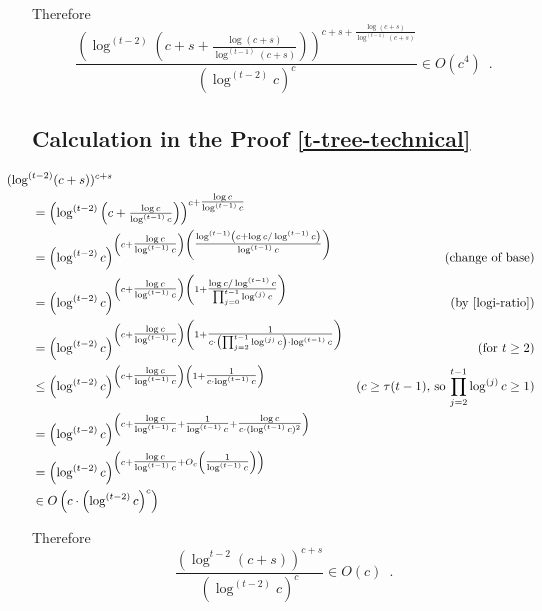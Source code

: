 \documentclass[kpfonts]{patmorin}
\theoremstyle{named}
\begin{document}
Therefore
\[
  \frac{\left(\log^{(t-2)}\left(c+s+\tfrac{\log(c+s)}{\log^{(t-1)}(c+s)}\right)\right)^{c+s+\tfrac{\log(c+s)}{\log^{(t-1)}(c+s)}}}
  {(\log^{(t-2)} c)^c}
  \in O(c^4) \enspace .
\]

\subsection{Calculation in the Proof \cref{t-tree-technical}}
\label{calculation-ii}

\begin{align*}
    & \hspace{-2em}(\log^{(t-2)}(c+s))^{c+s} \\
    & = \left(\log^{(t-2)}\left(c+\tfrac{\log c}{\log^{(t-1)} c}\right)\right)^{c+\tfrac{\log c}{\log^{(t-1)} c}} \\
    & = \left(\log^{(t-2)}c\right)^{\left(c+\tfrac{\log c}{\log^{(t-1)} c}\right)
    \left(\tfrac{\log^{(t-1)}\left(c+\log c/\log^{(t-1)} c\right)}{\log^{(t-1)} c}\right)} &\text{(change of base)} \\
    & = \left(\log^{(t-2)}c\right)^{\left(c+\tfrac{\log c}{\log^{(t-1)} c}\right)
    \left(
    1 + \tfrac{\log c/\log^{(t-1)} c}{\prod_{j=0}^{t-1}\log^{(j)}c}
    \right)} & \text{(by \cref{logi-ratio})} \\
    & = \left(\log^{(t-2)}c\right)^{\left(c+\tfrac{\log c}{\log^{(t-1)} c}\right)
    \left(
    1 + \tfrac{1}{c\cdot\left(\prod_{j=2}^{t-1}\log^{(j)}c\right)\cdot\log^{(t-1)} c}
    \right)} & \text{(for $t\ge 2$)} \\
    & \le \left(\log^{(t-2)}c\right)^{\left(c+\tfrac{\log c}{\log^{(t-1)} c}\right)
    \left(
    1 + \tfrac{1}{c\cdot\log^{(t-1)} c}
    \right)} & \text{($c\ge \tau(t-1)$, so $\prod_{j=2}^{t-1}\log^{(j)}c\ge 1$)} \\
    & = \left(\log^{(t-2)}c\right)^{\left(c+\tfrac{\log c}{\log^{(t-1)} c}+
    \tfrac{1}{\log^{(t-1)} c} + \tfrac{\log c}{c\cdot(\log^{(t-1)} c)^2}
    \right)}  \\
    & = \left(\log^{(t-2)}c\right)^{\left(c+\tfrac{\log c}{\log^{(t-1)} c}
      + O_c\left(\tfrac{1}{\log^{(t-1)} c}\right)
    \right)}  \\
    & \in O\left(c\cdot\left(\log^{(t-2)}c\right)^c\right)
\end{align*}

Therefore
\[
    \frac{(\log^{t-2} (c+s))^{c+s}}{(\log^{(t-2)}c)^c} \in O(c) \enspace .
\]
\end{document}
